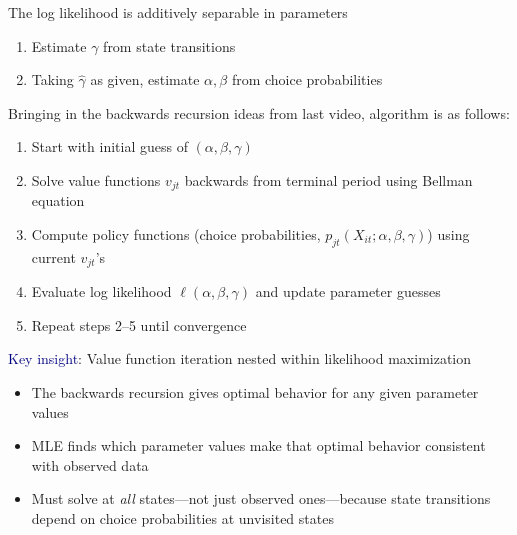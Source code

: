 \documentclass[aspectratio=169]{beamer}
\begin{document}
\begin{frame}

The log likelihood is additively separable in parameters

\bigskip{}


\begin{enumerate}
\itemsep1.5em
    \item<3-> Estimate $\gamma$ from state transitions
    \item<4-> Taking $\hat{\gamma}$ as given, estimate $\alpha, \beta$ from choice probabilities
\end{enumerate}
\bigskip{}



\end{frame}



\begin{frame}

Bringing in the backwards recursion ideas from last video, algorithm is as follows:

\bigskip{}

\begin{enumerate}
\itemsep1.5em
    \item<2-> Start with initial guess of $(\alpha,\beta,\gamma)$
    \item<3-> Solve value functions $v_{jt}$ backwards from terminal period using Bellman equation
    \item<4-> Compute policy functions (choice probabilities, $p_{jt}(X_{it};\alpha,\beta,\gamma)$) using current $v_{jt}$'s
    \item<5-> Evaluate log likelihood $\ell(\alpha,\beta,\gamma)$ and update parameter guesses
    \item<6-> Repeat steps 2--5 until convergence
\end{enumerate}

\end{frame}





\begin{frame}

\textcolor{navy}{Key insight}: Value function iteration nested within likelihood maximization

\bigskip{}

\begin{itemize}
\itemsep1.5em
    \item<2-> The backwards recursion gives optimal behavior for any given parameter values
    \item<3-> MLE finds which parameter values make that optimal behavior consistent with observed data
    \item<4-> Must solve at \textit{all} states---not just observed ones---because state transitions depend on choice probabilities at unvisited states
\end{itemize}

\end{frame}
\end{document}
